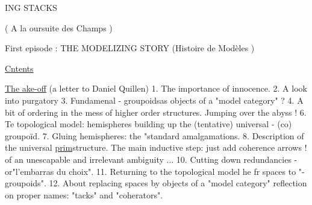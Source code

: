 ING STACKS

( A la oursuite des Champs )

First episode : THE MODELIZING STORY
(Histoire de Modèles )

\uline{Cntents} \hand{,}

 \uline{The ake-off} (a letter to Daniel Quillen)
1. The importance of innocence.
2. A  look into purgatory
3. Fundamenal \hand{$\infty$}- groupoidsas objects of a "model category" ?
4. A bit of ordering in the mess of higher order structures.
 Jumping over the abyss !
6. Te topological model: hemispheres building up the (tentative)
universal \hand{$\infty$}- (co) groupoïd.
7. Gluing hemispheres: the "standard amalgamations.
8. Description of the universal \uline{prim}\hand{/}structure.
 The main inductive step: just add coherence arrows !    
  of an \hand{(}unescapable and irrelevant\hand{)} ambiguity ...
10. Cutting down redundancies - or\hand{:}"l'embarras du choix".
11. Returning to the topological model \hand{(} he  
 fr spaces to "\unsure{$\infty$}-groupoids"\hand{)}.
12. About replacing spaces by objects of a "model category" 
   reflection on proper names: "tacks" and "coherators".
